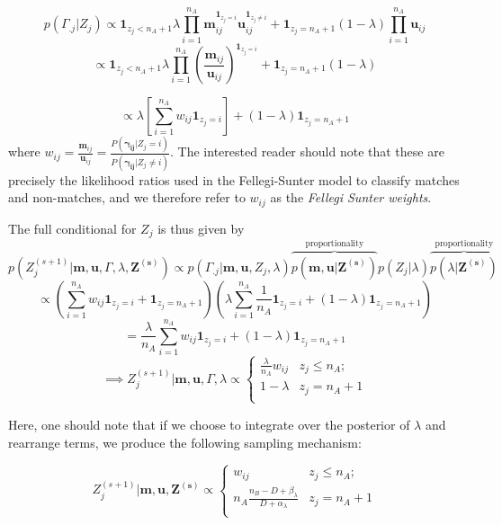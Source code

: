 \documentclass[
  12pt,
]{article}
\begin{document}
\[p(\Gamma_{.j}|Z_{j}) \propto \mathbf{1}_{z_j < n_A + 1}\lambda\prod_{i=1}^{n_A}\mathbf{m}_{ij}^{\mathbf{1}_{z_j = i}}\mathbf{u}_{ij}^{\mathbf{1}_{z_j \neq i}} + \mathbf{1}_{z_j = n_A + 1}(1-\lambda)\prod_{i=1}^{n_A}\mathbf{u}_{ij}\]
\[\propto \mathbf{1}_{z_j < n_A + 1}\lambda\prod_{i=1}^{n_A}\left(\frac{\mathbf{m}_{ij}}{\mathbf{u}_{ij}}\right)^{\mathbf{1}_{z_j = i}}+ \mathbf{1}_{z_j = n_A + 1}(1-\lambda)\]

\[\propto \lambda \left[\sum_{i=1}^{n_A}w_{ij}\mathbf{1}_{z_j = i}\right] + (1 - \lambda)\mathbf{1}_{z_j = n_A + 1}\]
where
\(w_{ij} = \frac{\mathbf{m}_{ij}}{\mathbf{u}_{ij}} = \frac{P(\boldsymbol{\gamma_{ij}}|Z_j = i)}{P(\boldsymbol{\gamma_{ij}} |Z_j \neq i)}\).
The interested reader should note that these are precisely the
likelihood ratios used in the Fellegi-Sunter model to classify matches
and non-matches, and we therefore refer to \(w_{ij}\) as the
\emph{Fellegi Sunter weights}.

The full conditional for \(Z_j\) is thus given by
\[p(Z_j^{(s+1)}|\mathbf{m}, \mathbf{u}, \Gamma, \lambda, \mathbf{Z^{(s)}}) \propto p(\Gamma_{.j}|\mathbf{m}, \mathbf{u}, Z_j, \lambda)\overbrace{p(\mathbf{m}, \mathbf{u}|\mathbf{Z^{(s)}})}^{\text{proportionality}}p(Z_j | \lambda) \overbrace{p(\lambda|\mathbf{Z^{(s)}})}^{\text{proportionality}}\]
\[\propto \left(\sum_{i=1}^{n_A}w_{ij}\mathbf{1}_{z_j = i} + \mathbf{1}_{z_j = n_A + 1}\right)\left(\lambda\sum_{i=1}^{n_A}\frac{1}{n_A}\mathbf{1}_{z_j = i} + (1-\lambda)\mathbf{1}_{z_j = n_A + 1}\right)\]
\[= \frac{\lambda}{n_A}\sum_{i=1}^{n_A}w_{ij}\mathbf{1}_{z_j = i} + (1-\lambda)\mathbf{1}_{z_j = n_A + 1} \]
\[ \implies Z_j^{(s+1)} | \mathbf{m}, \mathbf{u}, \Gamma, \lambda \propto
\begin{cases} 
    \frac{\lambda}{n_A}w_{ij}   & z_j \leq n_A; \\
     1-\lambda &  z_j  = n_A + 1 \\
\end{cases}\]

Here, one should note that if we choose to integrate over the posterior
of \(\lambda\) and rearrange terms, we produce the following sampling
mechanism:

\[Z_j^{(s+1)} | \mathbf{m}, \mathbf{u}, \mathbf{Z^{(s)}} \propto
\begin{cases} 
    w_{ij}  & z_j \leq n_A; \\
     n_A \frac{n_B - D + \beta_{\lambda}}{D + \alpha_{\lambda}} &  z_j  = n_A + 1 \\
\end{cases}\]
\end{document}

